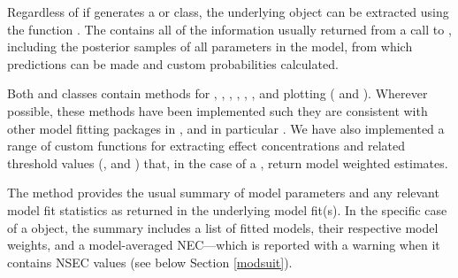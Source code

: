 \documentclass[
  shortnames]{jss}
\begin{document}
Regardless of if  generates a  or  class, the underlying  object can be extracted using the function . The  contains all of the information usually returned from a call to , including the posterior samples of all parameters in the model, from which predictions can be made and custom probabilities calculated.

Both  and  classes contain methods for , , , , , ,  and plotting ( and \newline {}). Wherever possible, these methods have been implemented such they are consistent with other model fitting packages in , and in particular . We have also implemented a range of custom functions for extracting effect concentrations and related threshold values (,  and ) that, in the case of a , return model weighted estimates.

The  method provides the usual summary of model parameters and any relevant model fit statistics as returned in the underlying  model fit(s). In the specific case of a  object, the summary includes a list of fitted models, their respective model weights, and a model-averaged NEC---which is reported with a warning when it contains NSEC values (see below Section \ref{modsuit}).
\end{document}
